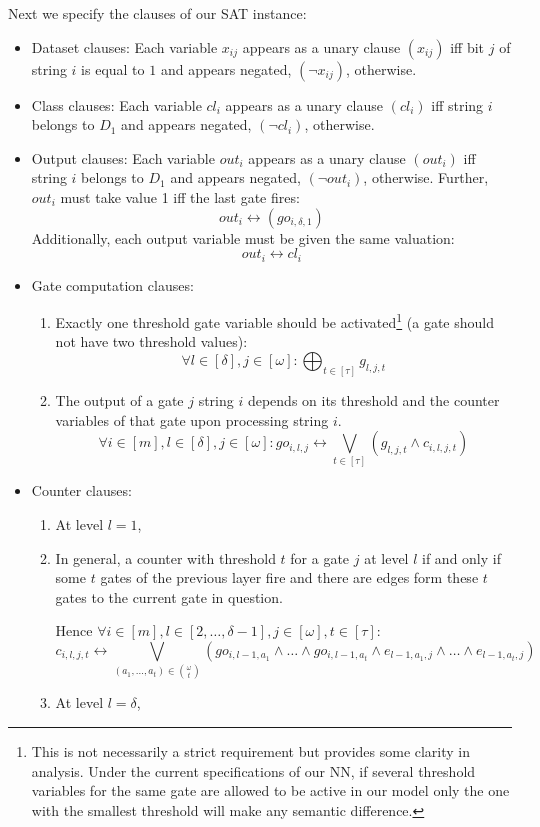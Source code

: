\noindent Next we specify the clauses of our SAT instance: 
\begin{itemize}
    \item Dataset clauses: Each variable $x_{ij}$ appears as a unary clause $(x_{ij})$ iff bit $j$ of string $i$ is equal to $1$ and appears negated, $(\neg x_{ij})$, otherwise.
    \item Class clauses: Each variable $cl_{i}$ appears as a unary clause $(cl_{i})$ iff string $i$ belongs to $D_1$ and appears negated, $(\neg cl_{i})$, otherwise.
    \item Output clauses: Each variable $out_{i}$ appears as a unary clause $(out_{i})$ iff string $i$ belongs to $D_1$ and appears negated, $(\neg out_{i})$, otherwise. Further, $out_i$ must take value 1 iff the last gate fires: $$out_i \leftrightarrow (go_{i,\delta,1})$$ Additionally, each output variable must be given the same valuation: $$out_{i}\leftrightarrow cl_i$$
    \item Gate computation clauses:
    \begin{enumerate}
        \item Exactly one threshold gate variable should be activated\footnote{This is not necessarily a strict requirement but provides some clarity in analysis. Under the current specifications of our NN, if several threshold variables for the same gate are allowed to be active in our model only the one with the smallest threshold will make any semantic difference.} (a gate should not have two threshold values): 
        $$\forall l \in [\delta], j \in [\omega]: \bigoplus_{t\in[\tau]} g_{l,j,t}$$ 
        \item The output of a gate $j$ string $i$ depends on its threshold and the counter variables of that gate upon processing string $i$.
        $$\forall i \in [m], l \in [\delta], j \in [\omega]: go_{i,l,j} \leftrightarrow \bigvee_{t\in[\tau]} (g_{l,j,t} \land c_{i,l,j,t})$$ 
    \end{enumerate}
    \item Counter clauses:
     \begin{enumerate}
         \item At level $l=1$, 
         \item In general, a counter with threshold $t$ for a gate $j$ at level $l$ if and only if some $t$ gates of the previous layer fire and there are edges form these $t$ gates to the current gate in question.
         
         Hence $\forall i \in [m], l \in [2, \ldots, \delta-1], j \in [\omega], t \in [\tau]:$
         $$ c_{i,l,j,t} \leftrightarrow \bigvee_{(a_1,\ldots, a_t) \in {\omega \choose t}}(go_{i,l-1,a_1}\land\dots\land go_{i,l-1,a_t}\land e_{l-1,a_1,j}\land\dots\land e_{l-1,a_t,j}) $$
         \item At level $l=\delta$,
     \end{enumerate}
     

\end{itemize}
